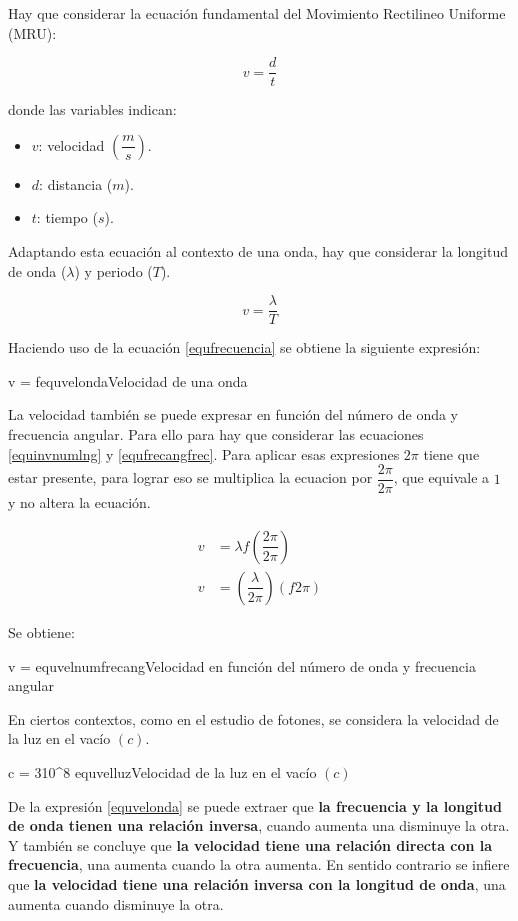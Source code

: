 Hay que considerar la ecuación fundamental del Movimiento Rectilineo Uniforme (MRU):

\[\boxed{
  v = \dfrac{d}{t}
}\]

donde las variables indican:

\begin{itemize}
  \item $v$: velocidad $\left(\dfrac{m}{s}\right)$.
  \item $d$: distancia ($m$).
  \item $t$: tiempo ($s$).
\end{itemize}

Adaptando esta ecuación al contexto de una onda, hay que considerar la longitud de onda ($\lambda$) y periodo ($T$).

\[\boxed{
  v = \dfrac{\lambda}{T}
}\]

Haciendo uso de la ecuación \ref{equfrecuencia} se obtiene la siguiente expresión:

\begin{listequbox}
  {v = \lambda f}{equvelonda}{Velocidad de una onda}
\end{listequbox}

La velocidad también se puede expresar en función del número de onda y frecuencia angular. Para ello para hay que considerar las ecuaciones \ref{equinvnumlng} y \ref{equfrecangfrec}. Para aplicar esas expresiones $2\pi$ tiene que estar presente, para lograr eso se multiplica la ecuacion por $\dfrac{2\pi}{2\pi}$, que equivale a $1$ y no altera la ecuación.

\begin{align*}
  v &= \lambda f\left(\dfrac{2\pi}{2\pi}\right) \\
  v &= \left(\dfrac{\lambda}{2\pi}\right)\left(f2\pi\right)
\end{align*}

Se obtiene:

\begin{listequbox}
  {v = }{equvelnumfrecang}{Velocidad en función del número de onda y frecuencia angular}
\end{listequbox}

En ciertos contextos, como en el estudio de fotones, se considera la velocidad de la luz en el vacío $(c)$.

\begin{listequbox}
  {c = 310^8 }{equvelluz}{Velocidad de la luz en el vacío $(c)$}
\end{listequbox}

De la expresión \ref{equvelonda} se puede extraer que \textbf{la frecuencia y la longitud de onda tienen una relación inversa}, cuando aumenta una disminuye la otra. Y también se concluye que \textbf{la velocidad tiene una relación directa con la frecuencia}, una aumenta cuando la otra aumenta. En sentido contrario se infiere que \textbf{la velocidad tiene una relación inversa con la longitud de onda}, una aumenta cuando disminuye la otra.
